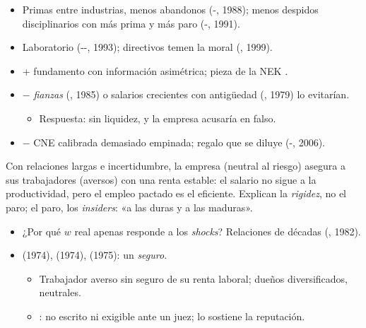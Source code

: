 \documentclass{article}
\begin{document}
\begin{columnas}
\begin{itemize}
\item Primas entre industrias, menos abandonos (-, 1988); menos despidos disciplinarios con más prima y más paro (-, 1991).
\item Laboratorio (--, 1993); directivos temen la moral (, 1999).
\end{itemize}
\begin{itemize}
\item + fundamento con información asimétrica; pieza de la NEK .
\item $-$ \emph{fianzas} (, 1985) o salarios crecientes con antigüedad (, 1979) lo evitarían.
  \begin{itemize}
  \item Respuesta: sin liquidez, y la empresa acusaría en falso.
  \end{itemize}
\item $-$ CNE calibrada demasiado empinada; regalo que se diluye (-, 2006).
\end{itemize}

\begin{ideaclave}
Con relaciones largas e incertidumbre, la empresa (neutral al riesgo) asegura a sus trabajadores (aversos) con una renta estable: el salario no sigue a la productividad, pero el empleo pactado es el eficiente. Explican la \emph{rigidez}, no el paro; el paro, los \emph{insiders}: «a las duras y a las maduras».
\end{ideaclave}

\begin{itemize}
\item ¿Por qué $w$ real apenas responde a los \emph{shocks}? Relaciones de décadas (, 1982).
\item {} (1974),  (1974),  (1975): un \emph{seguro}.
  \begin{itemize}
  \item Trabajador averso sin seguro de su renta laboral; dueños diversificados, neutrales.
  \item {}: no escrito ni exigible ante un juez; lo sostiene la reputación.
  \end{itemize}
\end{itemize}


\end{columnas}
\end{document}
